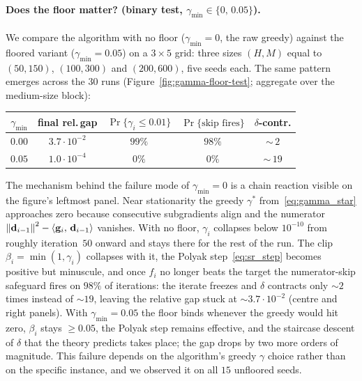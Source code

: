 \paragraph{Does the floor matter? (binary test, $\gamma_{\min}\in\{0,\,0.05\}$).}
We compare the algorithm with no floor ($\gamma_{\min}=0$, the raw
greedy) against the floored variant ($\gamma_{\min}=0.05$) on a $3\times
5$ grid: three sizes $(H,M)$ equal to $(50,150)$, $(100,300)$ and
$(200,600)$, five seeds each. The same pattern emerges across the $30$
runs (Figure~\ref{fig:gamma-floor-test}; aggregate over the medium-size
block):

\begin{table}[H]
    \centering
    \small
    \setlength{\tabcolsep}{8pt}
    \begin{tabular}{ccccc}
        \toprule
        $\gamma_{\min}$ & final rel.\,gap & $\Pr\!\{\gamma_{i}\le 0.01\}$ & $\Pr\!\{\text{skip fires}\}$ & $\delta$-contr. \\
        \midrule
        $0.00$ & $3.7\cdot 10^{-2}$ & $99\%$ & $98\%$ & ${\sim}\,2$ \\
        $0.05$ & $1.0\cdot 10^{-4}$ & $0\%$  & $0\%$  & ${\sim}\,19$ \\
        \bottomrule
    \end{tabular}
\end{table}

The mechanism behind the failure mode of $\gamma_{\min}=0$ is a
chain reaction visible on the figure's leftmost panel. Near stationarity
the greedy $\gamma^{*}$ from~\eqref{eq:gamma_star} approaches zero
because consecutive subgradients align and the numerator
$\left\lVert \mathbf{d}_{i-1} \right\rVert^{2}-\left\langle \mathbf{g}_{i},\, \mathbf{d}_{i-1} \right\rangle$
vanishes. With no floor, $\gamma_{i}$ collapses below $10^{-10}$ from
roughly iteration~$50$ onward and stays there for the rest of the run.
The clip $\beta_{i}=\min(1,\gamma_{i})$ collapses with it, the Polyak
step~\eqref{eq:sr_step} becomes positive but minuscule, and once $f_{i}$
no longer beats the target the numerator-skip safeguard fires on $98\%$
of iterations: the
iterate freezes and $\delta$ contracts only $\sim\!2$ times instead of
$\sim\!19$, leaving the relative gap stuck at $\sim\!3.7\cdot 10^{-2}$
(centre and right panels). With $\gamma_{\min}=0.05$ the floor binds whenever the
greedy would hit zero, $\beta_{i}$ stays $\ge 0.05$, the Polyak step
remains effective, and the staircase descent of $\delta$ that the theory
predicts takes place; the gap drops by two more orders of magnitude.
This failure depends on the algorithm's greedy $\gamma$ choice rather
than on the specific instance, and we observed it on all $15$ unfloored
seeds.

